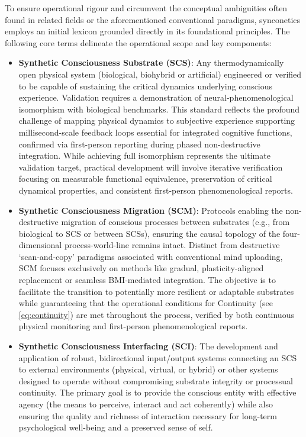 \documentclass[10pt]{article}
\begin{document}
\begin{sloppypar}
  To ensure operational rigour and circumvent the conceptual ambiguities often found in related fields or the aforementioned conventional paradigms, synconetics employs an initial lexicon grounded directly in its foundational principles. The following core terms delineate the operational scope and key components:

  \begin{itemize}
    \item \textbf{Synthetic Consciousness Substrate (SCS)}: Any thermodynamically open physical system (biological, biohybrid or artificial) engineered or verified to be capable of sustaining the critical dynamics underlying conscious experience. Validation requires a demonstration of neural-phenomenological isomorphism with biological benchmarks. This standard reflects the profound challenge of mapping physical dynamics to subjective experience supporting millisecond-scale feedback loops essential for integrated cognitive functions, confirmed via first-person reporting during phased non-destructive integration. While achieving full isomorphism represents the ultimate validation target, practical development will involve iterative verification focusing on measurable functional equivalence, preservation of critical dynamical properties, and consistent first-person phenomenological reports.

    \item \textbf{Synthetic Consciousness Migration (SCM)}: Protocols enabling the non-destructive migration of conscious processes between substrates (e.g., from biological to SCS or between SCSs), ensuring the causal topology of the four-dimensional process-world-line remains intact. Distinct from destructive ‘scan-and-copy’ paradigms associated with conventional mind uploading, SCM focuses exclusively on methods like gradual, plasticity-aligned replacement or seamless BMI-mediated integration. The objective is to facilitate the transition to potentially more resilient or adaptable substrates while guaranteeing that the operational conditions for Continuity (see \autoref{eq:continuity}) are met throughout the process, verified by both continuous physical monitoring and first-person phenomenological reports.

    \item \textbf{Synthetic Consciousness Interfacing (SCI)}: The development and application of robust, bidirectional input/output systems connecting an SCS to external environments (physical, virtual, or hybrid) or other systems designed to operate without compromising substrate integrity or processual continuity. The primary goal is to provide the conscious entity with effective agency (the means to perceive, interact and act coherently) while also ensuring the quality and richness of interaction necessary for long-term psychological well-being and a preserved sense of self.


\end{itemize}
\end{sloppypar}
\end{document}
